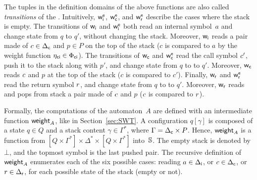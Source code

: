 The tuples in the definition domains of the above functions 
are also called \emph{transitions} of the \SWVPA.
%
\noindent
Intuitively, $\weiei$, $\weiec$, and $\weier$ describe the cases where the stack is empty.
The transitions of ${\mathsf{w}_\mathsf{i}}$ and $\weiei$ both read an internal symbol~$a$ 
and change state from $q$ to $q'$, without changing the stack.
Moreover, ${\mathsf{w}_\mathsf{i}}$ reads a pair made of
${c} \in {\Delta_\mathsf{c}}$ and $p \in P$ on the top of the stack
($c$ is compared to $a$ by the weight function $\eta_\mathsf{ci} \in {\Phi_\mathsf{ci}}$).
%
\noindent
The transitions of ${\mathsf{w}_\mathsf{c}}$ and $\weiec$ read the call symbol $c'$,
push it to the stack along with $p'$, and change state from $q$ to to $q'$.
Moreover, ${\mathsf{w}_\mathsf{c}}$ reads ${c}$ and $p$ at the top of the stack
($c$ is compared to $c'$).
%
\noindent
Finally, ${\mathsf{w}_\mathsf{r}}$ and $\weier$ read the return symbol $r$, and change state from $q$ to to $q'$.
Moreover, ${\mathsf{w}_\mathsf{r}}$ reads and pops from stack a pair made of $c$ and $p$
($c$ is compared to $r$).

Formally, the computations of the automaton~$A$ are defined
with an intermediate function $\mathsf{weight}_A$, like in Section~\ref{sec:SWT}.
%
A configuration $q[\gamma]$
is composed of a state $q \in Q$
and a stack content $\gamma \in \Gamma^*$,
where $\Gamma = {\Delta_\mathsf{c}} \times P$.
Hence, $\mathsf{weight}_A$ is a function from
$[Q \times \Gamma^*] \times \Delta^* \times [Q \times \Gamma^*]$ into~$\mathbb{S}$.
The empty stack is denoted by $\bot$, and the topmost
symbol is the last pushed pair.
%
The recursive definition of $\mathsf{weight}_A$
enumerates each of the six possible cases:
reading $a \in {\Delta_\mathsf{i}}$,
or $c \in {\Delta_\mathsf{c}}$, or $r \in {\Delta_\mathsf{r}}$,
for each possible state of the stack (empty or not).

